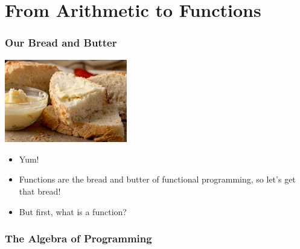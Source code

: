 \documentclass{beamer}
\begin{document}


\section{From Arithmetic to Functions}
\begin{frame}
  \frametitle{Our Bread and Butter}
  \begin{center}
    \includegraphics[width=0.4\textwidth]{images/bread-butter.jpg}
  \end{center}
  \begin{itemize}
  \item<2-> Yum!
  \item<3-> Functions are the bread and butter of functional programming, so let's get that bread!
  \item<4-> \huge But first, what is a function?
  \end{itemize}
\end{frame}



\begin{frame}
  \frametitle{The Algebra of Programming}
\end{frame}
\end{document}
